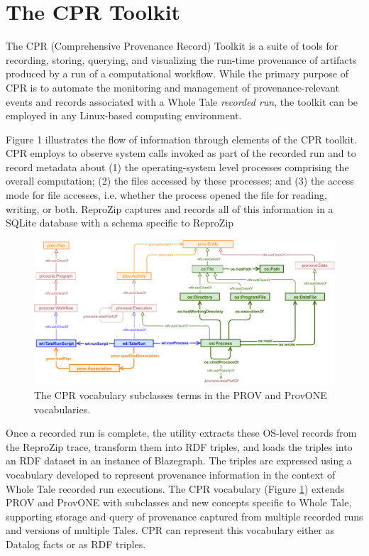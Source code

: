 \section{The CPR Toolkit}

The CPR (Comprehensive Provenance Record) Toolkit is a suite of tools for recording, storing, querying, and visualizing the run-time provenance of artifacts produced by a run of a computational workflow. While the primary purpose of CPR  is to automate the monitoring and management of provenance-relevant events and records associated with a Whole Tale \emph{recorded run}, the toolkit can be employed in any Linux-based computing environment.

Figure 1 illustrates the flow of information through elements of the CPR toolkit. CPR employs  to observe system calls invoked as part of the recorded run and to record metadata about (1) the operating-system level processes comprising the overall computation; (2) the files accessed by these processes; and (3) the access mode for file accesses, i.e. whether the process opened the file for reading, writing, or both. ReproZip captures and records all of this information in a SQLite database with a schema specific to ReproZip

\begin{figure}
    \includegraphics[width=\linewidth]{figures/cpr-vocab.pdf}
    \caption{The CPR vocabulary subclasses terms in the PROV and ProvONE vocabularies.}
    \label{fig:cpr-vocab}
\end{figure}

Once a recorded run is complete, the  utility extracts these OS-level records from the ReproZip trace, transform them into RDF triples, and loads the triples into an RDF dataset in an instance of Blazegraph. The triples are expressed using a vocabulary developed to represent provenance information in the context of Whole Tale recorded run executions. The CPR vocabulary (Figure \ref{fig:cpr-vocab}) extends PROV and ProvONE with subclasses and new concepts specific to Whole Tale, supporting storage and query of provenance captured from multiple recorded runs and versions of multiple Tales. CPR can represent this vocabulary either as Datalog facts or as RDF triples.

